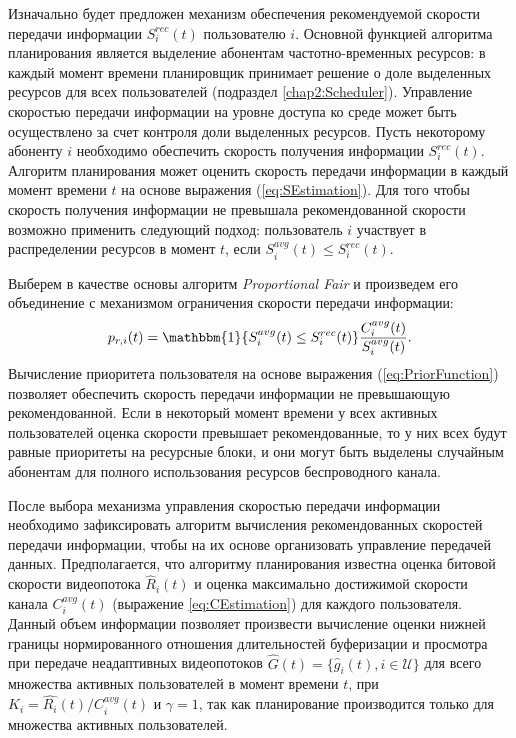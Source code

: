 Изначально будет предложен механизм обеспечения рекомендуемой скорости передачи информации $S^{rec}_i(t)$ пользователю $i$. Основной функцией алгоритма планирования является выделение абонентам частотно-временных ресурсов: в каждый момент времени планировщик принимает решение о доле выделенных ресурсов для всех пользователей (подраздел \ref{chap2:Scheduler}). Управление скоростью передачи информации на уровне доступа ко среде может быть осуществлено за счет контроля доли выделенных ресурсов. Пусть некоторому абоненту $i$ необходимо обеспечить скорость получения информации $S^{rec}_i(t)$. Алгоритм планирования может оценить скорость передачи информации в каждый момент времени $t$ на основе выражения (\ref{eq:SEstimation}). Для того чтобы скорость получения информации не превышала рекомендованной скорости возможно применить следующий подход: пользователь $i$ участвует в распределении ресурсов в момент $t$, если $S_i^{avg}(t) \leq S^{rec}_i(t).$

Выберем в качестве основы алгоритм \textit{Proportional Fair} и произведем его объединение с механизмом ограничения скорости передачи информации:
\begin{equation}
\label{eq:PriorFunction}
p_{r,i}(t) = \mathbbm{1}\{S_i^{avg}(t) \leq S^{rec}_i(t)\}\frac{C_i^{avg}(t)}{S_i^{avg}(t)}.
\end{equation}
Вычисление приоритета пользователя на основе выражения (\ref{eq:PriorFunction}) позволяет обеспечить скорость передачи информации не превышающую рекомендованной. Если в некоторый момент времени у всех активных пользователей оценка скорости превышает рекомендованные, то у них всех будут равные приоритеты на ресурсные блоки, и они могут быть выделены случайным абонентам для полного использования ресурсов беспроводного канала.

После выбора механизма управления скоростью передачи информации необходимо зафиксировать алгоритм вычисления рекомендованных скоростей передачи информации, чтобы на их основе организовать управление передачей данных. Предполагается, что алгоритму планирования известна оценка битовой скорости видеопотока $\hat{R}_i(t)$ и оценка максимально достижимой скорости канала $C^{avg}_i(t)$ (выражение \ref{eq:CEstimation}) для каждого пользователя. Данный объем информации позволяет произвести вычисление оценки нижней границы нормированного отношения длительностей буферизации и просмотра при передаче неадаптивных видеопотоков $\hat{G}(t) = \{\hat{g}_i(t), i \in \mathcal{U}\}$ для всего множества активных пользователей в момент времени $t$, при $K_i = \hat{R_i}(t) / C^{avg}_i(t)$ и $\gamma = 1$, так как планирование производится только для множества активных пользователей.

